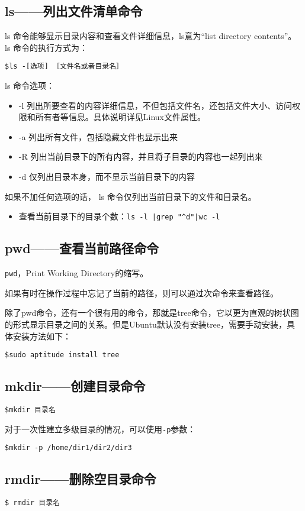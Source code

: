 \subsection{ls——列出文件清单命令}
ls 命令能够显示目录内容和查看文件详细信息，ls意为“list directory contents”。 ls 命令的执行方式为：

\verb*|$ls -[选项] ［文件名或者目录名］|

ls 命令选项：
\begin{itemize}
\item -l 列出所要查看的内容详细信息，不但包括文件名，还包括文件大小、访问权限和所有者等信息。具体说明详见Linux文件属性。
\item -a 列出所有文件，包括隐藏文件也显示出来
\item -R 列出当前目录下的所有内容，并且将子目录的内容也一起列出来
\item -d 仅列出目录本身，而不显示当前目录下的内容
\end{itemize}
如果不加任何选项的话， ls 命令仅列出当前目录下的文件和目录名。


\begin{itemize}
\item 查看当前目录下的目录个数：\verb?ls -l |grep "^d"|wc -l?
\end{itemize}





\subsection{pwd——查看当前路径命令}
\verb*|pwd|，Print Working Directory的缩写。

如果有时在操作过程中忘记了当前的路径，则可以通过次命令来查看路径。

除了pwd命令，还有一个很有用的命令，那就是tree命令，它以更为直观的树状图的形式显示目录之间的关系。但是Ubuntu默认没有安装tree，需要手动安装，具体安装方法如下：

\verb*|$sudo aptitude install tree|


\subsection{mkdir——创建目录命令}
\verb*|$mkdir 目录名|

对于一次性建立多级目录的情况，可以使用\verb*|-p|参数：

\verb*|$mkdir -p /home/dir1/dir2/dir3|


\subsection{rmdir——删除空目录命令}
\verb*|$ rmdir 目录名|

